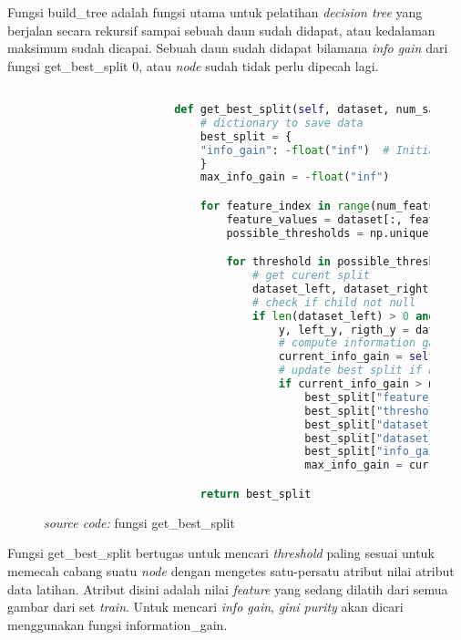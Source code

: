 		Fungsi build\_tree adalah fungsi utama untuk pelatihan \emph{decision tree} yang berjalan secara 
		rekursif sampai sebuah daun sudah didapat, atau kedalaman maksimum sudah dicapai. 
		Sebuah daun sudah didapat bilamana \textit{info gain} dari fungsi get\_best\_split 0, atau \textit{node} 
		sudah tidak perlu dipecah lagi.

		\begin{figure}[H]
			\begin{lstlisting}[language=Python, basicstyle=\tiny]

					def get_best_split(self, dataset, num_samples, num_features):
						# dictionary to save data
						best_split = {
						"info_gain": -float("inf")  # Initialize info_gain to a very small value
						} 
						max_info_gain = -float("inf")

						for feature_index in range(num_features):
							feature_values = dataset[:, feature_index]
							possible_thresholds = np.unique(feature_values)

							for threshold in possible_thresholds:
								# get curent split
								dataset_left, dataset_right = self.split(dataset, feature_index, threshold)
								# check if child not null
								if len(dataset_left) > 0 and len(dataset_right) > 0:
									y, left_y, rigth_y = dataset[:,-1], dataset_left[:,-1], dataset_right[:, -1]
									# compute information gain
									current_info_gain = self.information_gain(y, left_y, rigth_y, "gini")
									# update best split if needed
									if current_info_gain > max_info_gain:
										best_split["feature_index"] = feature_index
										best_split["threshold"] = threshold
										best_split["dataset_left"] = dataset_left
										best_split["dataset_right"] = dataset_right
										best_split["info_gain"] = current_info_gain
										max_info_gain = current_info_gain

						return best_split

			\end{lstlisting}
			\caption{\emph{source code:} fungsi get\_best\_split}
			\label{code: get split function}
		\end{figure}

		Fungsi get\_best\_split bertugas untuk mencari \textit{threshold} paling sesuai 
		untuk memecah cabang suatu \textit{node} dengan mengetes satu-persatu atribut nilai 
		atribut data latihan. Atribut disini adalah nilai \textit{feature} yang sedang dilatih 
		dari semua gambar dari set \textit{train}. Untuk mencari \textit{info gain}, \textit{gini purity} 
		akan dicari menggunakan fungsi information\_gain.

